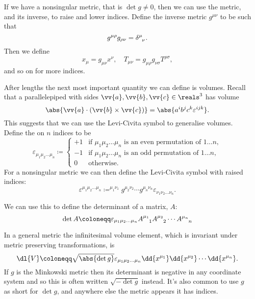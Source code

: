\documentclass[fleqn]{NotesClass}
\begin{document}
    If we have a nonsingular metric, that is \(\det g \ne 0\), then we can use the metric, and its inverse, to raise and lower indices.
    Define the inverse metric \(g^{\mu\nu}\) to be such that
    \begin{equation}
        g^{\mu\rho}g_{\rho\nu} = \tensor{\delta}{^\mu_\nu}.
    \end{equation}
    Then we define
    \begin{equation}
        x_\mu = g_{\mu\nu}x^\nu, \quad T_{\mu\nu} = g_{\mu\rho}g_{\nu\sigma}T^{\rho\sigma},
    \end{equation}
    and so on for more indices.
    
    After lengths the next most important quantity we can define is volumes.
    Recall that a parallelepiped with sides \(\vv{a}, \vv{b}, \vv{c} \in \reals^3\) has volume
    \begin{equation}
        \abs{\vv{a} \cdot (\vv{b} \times \vv{c})} = \abs{a^ib^jc^k\varepsilon^{ijk}}.
    \end{equation}
    This suggests that we can use the Levi-Civita symbol to generalise volumes.
    Define the  on \(n\) indices to be
    \begin{equation}
        \varepsilon_{\mu_1 \mu_2 \dots \mu_n} \coloneqq
        \begin{cases}
            +1 & \text{if } \mu_1 \mu_2 \dots \mu_n \text{ is an even permutation of } 1 \dots n,\\
            -1 & \text{if } \mu_1 \mu_2 \dots \mu_n \text{ is an odd permutation of } 1 \dots n,\\
            0 & \text{otherwise}.
        \end{cases}
    \end{equation}
    For a nonsingular metric we can then define the Levi-Civita symbol with raised indices:
    \begin{equation}
        \varepsilon^{\mu_1\mu_2 \dots \mu_n} \coloneqq ^{\mu_1\nu_1}g^{\mu_2\nu_2} \dotsm g^{\mu_n\nu_n} \varepsilon_{\nu_1\nu_2 \dots \nu_n}.
    \end{equation}
    
    We can use this to define the determinant of a matrix, \(A\):
    \begin{equation}
        \det A \coloneqq \varepsilon_{\mu_1\mu_2 \dots \mu_n} \tensor{A}{^{\mu_1}_1} \tensor{A}{^{\mu_2}_2} \dotsm \tensor{A}{^{\mu_n}_n}
    \end{equation}
    
    In a general metric the infinitesimal volume element, which is invariant under metric preserving transformations, is
    \begin{equation}
        \dl{V} \coloneqq \sqrt{\abs{\det g}} \varepsilon_{\mu_1\mu_2 \dots \mu_n} \dd{x^{\mu_1}} \dd{x^{\mu_2}} \dotsm \dd{x^{\mu_n}}.
    \end{equation}	
    If \(g\) is the Minkowski metric then its determinant is negative in any coordinate system and so this is often written \(\sqrt{-\det g}\) instead.
    It's also common to use \(g\) as short for \(\det g\), and anywhere else the metric appears it has indices.
    
\end{document}
